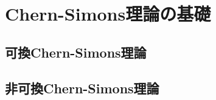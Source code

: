 \documentclass[TQFT_main]{subfiles}
\begin{document}

\chapter{Chern-Simons理論の基礎}

\section{可換Chern-Simons理論}

\section{非可換Chern-Simons理論}
\end{document}
